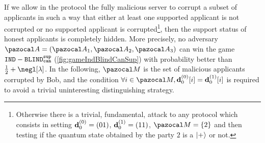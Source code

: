 \begin{lemmaE}\label{lem:securityBlindCanSup}
  If we allow in the protocol \blindCanSup{} the fully malicious server to corrupt a subset of applicants in such a way that either at least one supported applicant is not corrupted or no supported applicant is corrupted\footnote{Otherwise there is a trivial, fundamental, attack to any protocol which consists in setting $\mathbf{d}_0^{(0)} = (01)$, $\mathbf{d}_0^{(1)}=(11)$, $\cM=\{2\}$ and then testing if the quantum state obtained by the party $2$ is a $\ket{+}$ or not. }, then the support status of honest applicants is completely hidden. More precisely, no \QPT{} adversary $\cA = (\cA_1,\cA_2,\cA_3)$ can win the game $ {\tt IND- {\tt BLIND}^{\tt sup}_{\tt can} {}} {}$ (\cref{fig:gameIndBlindCanSup}) with probability better than $\frac{1}{2} + \negl[\lambda]$. In the following, $\cM$ is the set of malicious applicants corrupted by Bob, and the condition $\forall i \in \cM, \vect{d}_0^{(0)}[i] = \vect{d}_0^{(1)}[i]$ is required to avoid a trivial uninteresting distinguishing strategy.
  \begin{figure}[htb]
    \centering
    \begin {pcimage}
      {\normalfont{}}
\end{pcimage}
\end{figure}
\end{lemmaE}

